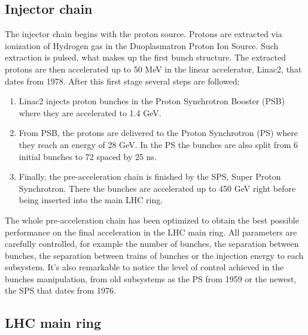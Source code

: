 \subsection{Injector chain}
\label{sec:injector}

The injector chain begins with the proton source. Protons are extracted via ionization of Hydrogen gas in the Duoplasmatron Proton Ion Source. Such extraction is pulsed, what makes up the first bunch structure. The extracted protons are then accelerated up to 50 MeV in the linear accelerator, Linac2, that dates from 1978. After this first stage several steps are followed:
\begin{enumerate}
\item Linac2 injects proton bunches in the Proton Synchrotron Booster (PSB) where they are accelerated to 1.4 GeV. 
\item From PSB, the protons are delivered to the Proton Synchrotron (PS) where they reach an energy of 28 GeV. In the PS the bunches are also split from 6 initial bunches to 72 spaced by 25 ns.
\item Finally, the pre-acceleration chain is finished by the SPS, Super Proton Synchrotron. There the bunches are accelerated up to 450 GeV right before being inserted into the main LHC ring. 
\end{enumerate}

The whole pre-acceleration chain has been optimized to obtain the best possible performance on the final acceleration in the LHC main ring. All parameters are carefully controlled, for example the number of bunches, the separation between bunches, the separation between trains of bunches or the injection energy to each subsystem. It's also remarkable to notice the level of control achieved in the bunches manipulation, from old subsystems as the PS from 1959 or the newest, the SPS that dates from 1976. 


\subsection{LHC main ring}
\label{sec:ring}

